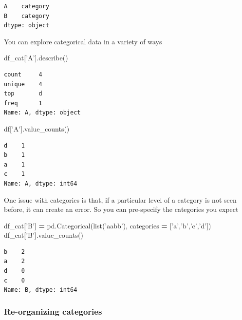\documentclass[
  letterpaper,
]{scrbook}
\newenvironment{Shaded}{\begin{snugshade}}{\end{snugshade}}
\newcommand{\BuiltInTok}[1]{#1}
\newcommand{\NormalTok}[1]{#1}
\newcommand{\OperatorTok}[1]{\textcolor[rgb]{0.81,0.36,0.00}{\textbf{#1}}}
\newcommand{\StringTok}[1]{\textcolor[rgb]{0.31,0.60,0.02}{#1}}
\begin{document}
\begin{verbatim}
A    category
B    category
dtype: object
\end{verbatim}

You can explore categorical data in a variety of ways

\begin{Shaded}
\begin{Highlighting}[]
\NormalTok{df_cat[}\StringTok{'A'}\NormalTok{].describe()}
\end{Highlighting}
\end{Shaded}

\begin{verbatim}
count     4
unique    4
top       d
freq      1
Name: A, dtype: object
\end{verbatim}

\begin{Shaded}
\begin{Highlighting}[]
\NormalTok{df[}\StringTok{'A'}\NormalTok{].value_counts()}
\end{Highlighting}
\end{Shaded}

\begin{verbatim}
d    1
b    1
a    1
c    1
Name: A, dtype: int64
\end{verbatim}

One issue with categories is that, if a particular level of a category is not seen before, it can create an error. So you can pre-specify the categories you expect

\begin{Shaded}
\begin{Highlighting}[]
\NormalTok{df_cat[}\StringTok{'B'}\NormalTok{] }\OperatorTok{=}\NormalTok{ pd.Categorical(}\BuiltInTok{list}\NormalTok{(}\StringTok{'aabb'}\NormalTok{), categories }\OperatorTok{=}\NormalTok{ [}\StringTok{'a'}\NormalTok{,}\StringTok{'b'}\NormalTok{,}\StringTok{'c'}\NormalTok{,}\StringTok{'d'}\NormalTok{])}
\NormalTok{df_cat[}\StringTok{'B'}\NormalTok{].value_counts()}
\end{Highlighting}
\end{Shaded}

\begin{verbatim}
b    2
a    2
d    0
c    0
Name: B, dtype: int64
\end{verbatim}

\hypertarget{re-organizing-categories}{%
\subsubsection{Re-organizing categories}\label{re-organizing-categories}}
\end{document}
